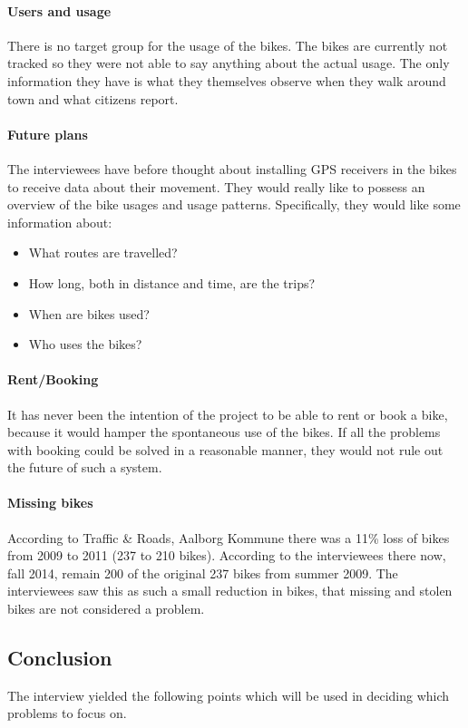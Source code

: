 \paragraph{Users and usage}
There is no target group for the usage of the bikes.
The bikes are currently not tracked so they were not able to say anything about the actual usage.
The only information they have is what they themselves observe when they walk around town and what citizens report.

\paragraph{Future plans}
The interviewees have before thought about installing GPS receivers in the bikes to receive data about their movement.
They would really like to possess an overview of the bike usages and usage patterns. 
Specifically, they would like some information about:
\begin{itemize}
\item What routes are travelled?
\item How long, both in distance and time, are the trips?
\item When are bikes used?
\item Who uses the bikes?
\end{itemize}

\paragraph{Rent/Booking}
It has never been the intention of the project to be able to rent or book a bike, because it would hamper the spontaneous use of the bikes.
If all the problems with booking could be solved in a reasonable manner, they would not rule out the future of such a system.

\paragraph{Missing bikes}
According to Traffic \& Roads, Aalborg Kommune\cite{cykelplanlaegning} there was a 11\% loss of bikes from 2009 to 2011 (237 to 210 bikes).
According to the interviewees there now, fall 2014, remain 200 of the original 237 bikes from summer 2009.
The interviewees saw this as such a small reduction in bikes, that missing and stolen bikes are not considered a problem.

\subsection{Conclusion}
The interview yielded the following points which will be used in deciding which problems to focus on.

